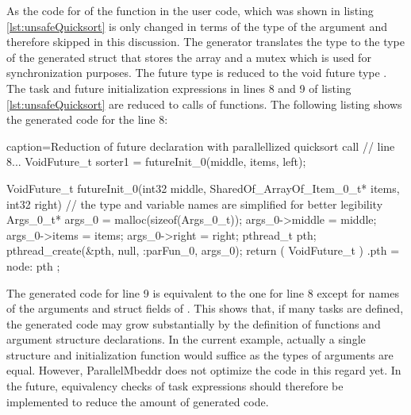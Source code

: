 As the code for of the  function in the user code, which was shown in listing \ref{lst:unsafeQuicksort} is only changed in terms of the type of the  argument and therefore skipped in this discussion. The generator translates the type  to the type of the generated struct  that stores the array and a mutex which is used for synchronization purposes. The future type  is reduced to the void future type . The task and future initialization expressions in lines 8 and 9 of listing \ref{lst:unsafeQuicksort} are reduced to calls of  functions. The following listing shows the generated code for the line 8:
\begin{ccode}{caption=Reduction of future declaration with parallellized quicksort call}
  // line 8...
  VoidFuture_t sorter1 = futureInit_0(middle, items, left);


VoidFuture_t futureInit_0(int32 middle, SharedOf_ArrayOf_Item_0_t* items, int32 right) {
  // the type and variable names are simplified for better legibility
  Args_0_t* args_0 = malloc(sizeof(Args_0_t)); 
  args_0->middle = middle; 
  args_0->items = items; 
  args_0->right = right; 
  pthread_t pth; 
  pthread_create(&pth, null, :parFun_0, args_0); 
  return ( VoidFuture_t ){ .pth = node: pth }; 
}
\end{ccode}
The generated code for line 9 is equivalent to the one for line 8 except for names of the arguments and struct fields of . This shows that, if many tasks are defined, the generated code may grow substantially by the definition of  functions and argument structure declarations. In the current example, actually a single structure and initialization function would suffice as the types of arguments are equal. However, ParallelMbeddr does not optimize the code in this regard yet. In the future, equivalency checks of task expressions should therefore be implemented to reduce the amount of generated code.

